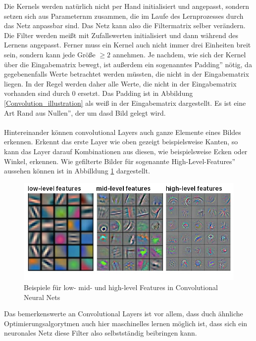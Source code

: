 \documentclass{article}
\begin{document}
Die Kernels werden natürlich nicht per Hand initialisiert und angepasst, sondern setzen sich aus Parameternm zusammen, die im Laufe des Lernprozesses durch das Netz anpassbar sind. Das Netz kann also die Filtermatrix selber verändern. Die Filter werden meißt mit Zufallswerten initialisiert und dann während des Lernens  angepasst. Ferner muss ein Kernel auch nicht immer drei Einheiten breit sein, sondern kann jede Größe $\ge2$ annehmen. Je nachdem, wie sich der Kernel über die Eingabematrix bewegt, ist außerdem ein sogenanntes \glqq Padding'' nötig, da gegebenenfalls Werte betrachtet werden müssten, die nicht in der Eingabematrix liegen. In der Regel werden daher alle Werte, die nicht in der Eingabematrix vorhanden sind durch 0 ersetzt. Das Padding ist in Abbildung \ref{Convolution_illustration} als weiß in der Eingabematrix dargestellt. Es ist eine Art \glqq Rand aus Nullen'', der um dasd Bild gelegt wird.\\ 
\\
Hintereinander können convolutional Layers auch ganze Elemente eines Bildes erkennen. Erkennt das erste Layer wie oben gezeigt beispielsweise Kanten, so kann das Layer darauf Kombinationen aus diesen, wie beispielsweise Ecken oder Winkel, erkennen. Wie gefilterte Bilder für sogenannte \glqq High-Level-Features'' aussehen können ist in Abbilldung \ref{HL_features_conv} dargestellt. 
\begin{figure}[h]
	\includegraphics[width=\linewidth]{../graphics/features.png}
	\caption[Beispiele für low- mid- und high-level Features in Convolutional Neural Nets\newline
	Quelle: https://tvirdi.github.io/2017-10-29/cnn/]{Beispiele für low- mid- und high-level Features in Convolutional Neural Nets}
	\label{HL_features_conv}
\end{figure}
Das bemerkenswerte an Convolutional Layers ist vor allem, dass duch ähnliche Optimierungsalgorytmen auch hier maschinelles lernen möglich ist, dass sich ein neuronales Netz diese Filter also selbstständig beibringen kann.
\end{document}
